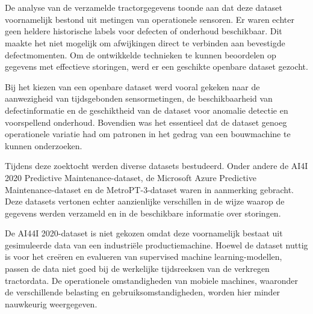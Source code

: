 
\newpage

\section{}%
\label{sec: het selecteren van een openbare dataset}

De analyse van de verzamelde tractorgegevens toonde aan dat deze dataset voornamelijk bestond uit metingen van operationele sensoren. Er waren echter geen heldere historische labels voor defecten of onderhoud beschikbaar. Dit maakte het niet mogelijk om afwijkingen direct te verbinden aan bevestigde defectmomenten. Om de ontwikkelde technieken te kunnen beoordelen op gegevens met effectieve storingen, werd er een geschikte openbare dataset gezocht.

Bij het kiezen van een openbare dataset werd vooral gekeken naar de aanwezigheid van tijdsgebonden sensormetingen, de beschikbaarheid van defectinformatie en de geschiktheid van de dataset voor anomalie detectie en voorspellend onderhoud. Bovendien was het essentieel dat de dataset genoeg operationele variatie had om patronen in het gedrag van een bouwmachine te kunnen onderzoeken.

Tijdens deze zoektocht werden diverse datasets bestudeerd. Onder andere de AI4I 2020 Predictive Maintenance-dataset, de Microsoft Azure Predictive Maintenance-dataset en de MetroPT-3-dataset waren in aanmerking gebracht. Deze datasets vertonen echter aanzienlijke verschillen in de wijze waarop de gegevens werden verzameld en in de beschikbare informatie over storingen.

De AI44I 2020-dataset is niet gekozen omdat deze voornamelijk bestaat uit gesimuleerde data van een industriële productiemachine. Hoewel de dataset nuttig is voor het creëren en evalueren van supervised machine learning-modellen, passen de data niet goed bij de werkelijke tijdsreeksen van de verkregen tractordata. De operationele omstandigheden van mobiele machines, waaronder de verschillende belasting en gebruiksomstandigheden, worden hier minder nauwkeurig weergegeven.

